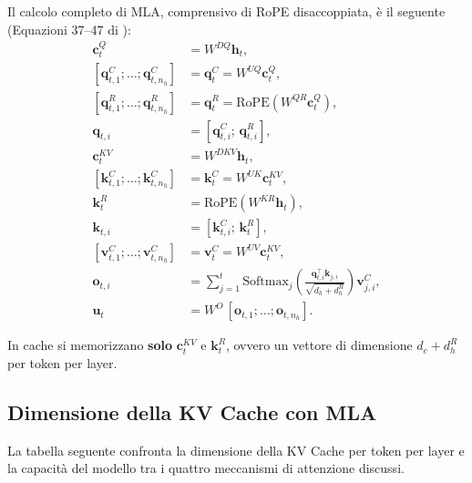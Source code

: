 Il calcolo completo di MLA, comprensivo di RoPE disaccoppiata, è il seguente
(Equazioni 37--47 di \citet{deepseekv2_2024}):
\begin{align}
  \mathbf{c}_t^Q &= W^{DQ}\mathbf{h}_t, \tag{37} \\
  [\mathbf{q}_{t,1}^C;\ldots;\mathbf{q}_{t,n_h}^C]
    &= \mathbf{q}_t^C = W^{UQ}\mathbf{c}_t^Q, \tag{38} \\
  [\mathbf{q}_{t,1}^R;\ldots;\mathbf{q}_{t,n_h}^R]
    &= \mathbf{q}_t^R = \text{RoPE}(W^{QR}\mathbf{c}_t^Q), \tag{39} \\
  \mathbf{q}_{t,i} &= [\mathbf{q}_{t,i}^C;\,\mathbf{q}_{t,i}^R], \tag{40} \\[4pt]
  \mathbf{c}_t^{KV} &= W^{DKV}\mathbf{h}_t, \tag{41} \\
  [\mathbf{k}_{t,1}^C;\ldots;\mathbf{k}_{t,n_h}^C]
    &= \mathbf{k}_t^C = W^{UK}\mathbf{c}_t^{KV}, \tag{42} \\
  \mathbf{k}_t^R &= \text{RoPE}(W^{KR}\mathbf{h}_t), \tag{43} \\
  \mathbf{k}_{t,i} &= [\mathbf{k}_{t,i}^C;\,\mathbf{k}_t^R], \tag{44} \\
  [\mathbf{v}_{t,1}^C;\ldots;\mathbf{v}_{t,n_h}^C]
    &= \mathbf{v}_t^C = W^{UV}\mathbf{c}_t^{KV}, \tag{45} \\[4pt]
  \mathbf{o}_{t,i}
    &= \sum_{j=1}^{t} \text{Softmax}_j\!\left(
        \frac{\mathbf{q}_{t,i}^\top \mathbf{k}_{j,i}}{\sqrt{d_h + d_h^R}}
      \right) \mathbf{v}_{j,i}^C, \tag{46} \\
  \mathbf{u}_t &= W^O\,[\mathbf{o}_{t,1};\ldots;\mathbf{o}_{t,n_h}]. \tag{47}
\end{align}

\noindent In cache si memorizzano \textbf{solo} $\mathbf{c}_t^{KV}$ e
$\mathbf{k}_t^R$, ovvero un vettore di dimensione $d_c + d_h^R$ per token per
layer.

\subsection{Dimensione della KV Cache con MLA}
\label{subsec:mla-kv-size}

La tabella seguente confronta la dimensione della KV Cache per token per layer
e la capacità del modello tra i quattro meccanismi di attenzione discussi.

